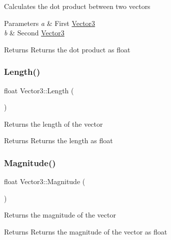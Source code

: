 Calculates the dot product between two vectors 
\begin{DoxyParams}{Parameters}
{\em a} & First \mbox{\hyperlink{struct_vector3}{Vector3}} \\
\hline
{\em b} & Second \mbox{\hyperlink{struct_vector3}{Vector3}} \\
\hline
\end{DoxyParams}
\begin{DoxyReturn}{Returns}
Returns the dot product as float 
\end{DoxyReturn}
\mbox{\label{struct_vector3_ae5218ba9e630cc051924d1b3b66d9c62}} 
\subsubsection{\texorpdfstring{Length()}{Length()}}
{\footnotesize\ttfamily float Vector3\+::\+Length (\begin{DoxyParamCaption}{ }\end{DoxyParamCaption})\hspace{0.3cm}{\ttfamily [inline]}}

Returns the length of the vector \begin{DoxyReturn}{Returns}
Returns the length as float 
\end{DoxyReturn}
\mbox{\label{struct_vector3_a5721d97b9640951b58c40de1a893f966}} 
\subsubsection{\texorpdfstring{Magnitude()}{Magnitude()}}
{\footnotesize\ttfamily float Vector3\+::\+Magnitude (\begin{DoxyParamCaption}{ }\end{DoxyParamCaption})\hspace{0.3cm}{\ttfamily [inline]}}

Returns the magnitude of the vector \begin{DoxyReturn}{Returns}
Returns the magnitude of the vector as float 
\end{DoxyReturn}
\mbox{\label{struct_vector3_a9c94cc16049543fc8edaba52c2b266b7}} 
